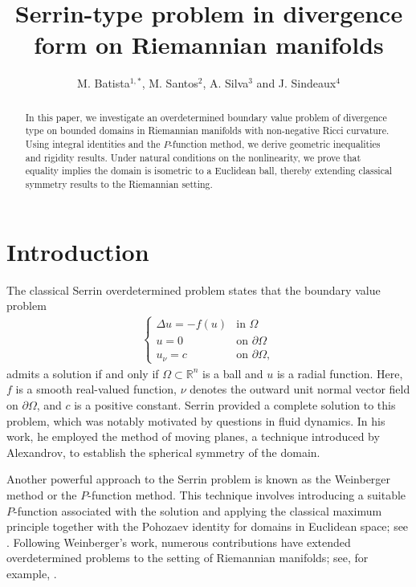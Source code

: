 \documentclass[12pt]{amsart}
\title[Serrin-type problem in divergence form on Riemannian manifolds]{Serrin-type problem in divergence form on Riemannian manifolds}
\author[M. Batista, M. Santos, A. Silva and J. Sindeaux]{M. Batista$^{1, *}$, M. Santos$^2$, A. Silva$^3$ and J. Sindeaux$^{4}$}
\theoremstyle{plain}
\numberwithin{equation}{section}
\begin{document}
\begin{abstract}
In this paper, we investigate an overdetermined boundary value problem of divergence type on bounded domains in Riemannian manifolds with non-negative Ricci curvature. Using integral identities and the $P$-function method, we derive geometric inequalities and rigidity results. Under natural conditions on the nonlinearity, we prove that equality implies the domain is isometric to a Euclidean ball, thereby extending classical symmetry results to the Riemannian setting.
\end{abstract}

\maketitle

\section{Introduction} 

The classical Serrin overdetermined problem \cite{serrin} states that the boundary value problem
\begin{align*} 
\left\{
\begin{array}{lll}
\Delta u=-f(u) & \text{in } \Omega \\
u= 0& \text{on } \partial\Omega \\
u_{\nu}=c& \text{on } \partial\Omega, 
\end{array}
\right.  
\end{align*}
admits a solution if and only if $\Omega \subset \mathbb{R}^n$ is a ball and $u$ is a radial function. Here, $f$ is a smooth real-valued function, $\nu$ denotes the outward unit normal vector field on $\partial \Omega$, and $c$ is a positive constant. Serrin provided a complete solution to this problem, which was notably motivated by questions in fluid dynamics. In his work, he employed the method of moving planes, a technique introduced by Alexandrov, to establish the spherical symmetry of the domain.

Another powerful approach to the Serrin problem is known as the Weinberger method or the $P$-function method. This technique involves introducing a suitable $P$-function associated with the solution and applying the classical maximum principle together with the Pohozaev identity for domains in Euclidean space; see \cite{wein}. Following Weinberger's work, numerous contributions have extended overdetermined problems to the setting of Riemannian manifolds; see, for example, \cite{ciraolo, delay, FK, FR, FRS, Roncoroni}.
\end{document}
